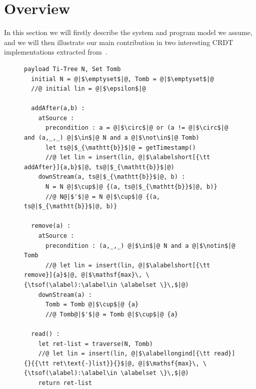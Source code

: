 \section{Overview}
\label{sec:overview}

In this section we will firstly describe the system and program model
we assume, and we will then illustrate our main contribution in two
interesting CRDT implementations extracted from~\cite{ShapiroPBZ11}.

\begin{figure}[t]
\begin{lstlisting}[caption={Pseudo-code of the Replicated Growable
Array (RGA) CRDT (adapted from~\cite{ShapiroPBZ11})},
captionpos=b,label={lst:rga}]
  payload Ti-Tree N, Set Tomb
  initial N = @|$\emptyset$|@, Tomb = @|$\emptyset$|@
  //@ initial lin = @|$\epsilon$|@

  addAfter(a,b) :
    atSource :
      precondition : a = @|$\circ$|@ or (a != @|$\circ$|@ and (a,_,_) @|$\in$|@ N and a @|$\not\in$|@ Tomb)
      let ts@|$_{\mathtt{b}}$|@ = getTimestamp()
      //@ let lin = insert(lin, @|$\alabelshort[{\tt addAfter}]{a,b}$|@, ts@|$_{\mathtt{b}}$|@)
    downStream(a, ts@|$_{\mathtt{b}}$|@, b) :
      N = N @|$\cup$|@ {(a, ts@|$_{\mathtt{b}}$|@, b)}
      //@ N@|$'$|@ = N @|$\cup$|@ {(a, ts@|$_{\mathtt{b}}$|@, b)}

  remove(a) :
    atSource :
      precondition : (a,_,_) @|$\in$|@ N and a @|$\notin$|@ Tomb
      //@ let lin = insert(lin, @|$\alabelshort[{\tt remove}]{a}$|@, @|$\mathsf{max}\, \{\tsof(\alabel):\alabel\in \alabelset \}\,$|@)
    downStream(a) :
      Tomb = Tomb @|$\cup$|@ {a}
      //@ Tomb@|$'$|@ = Tomb @|$\cup$|@ {a}

  read() :
    let ret-list = traverse(N, Tomb)
    //@ let lin = insert(lin, @|$\alabellongind[{\tt read}]{}{{\tt ret\text{-}list}}{}$|@, @|$\mathsf{max}\, \{\tsof(\alabel):\alabel\in \alabelset \}\,$|@)
    return ret-list
\end{lstlisting}
\end{figure}

